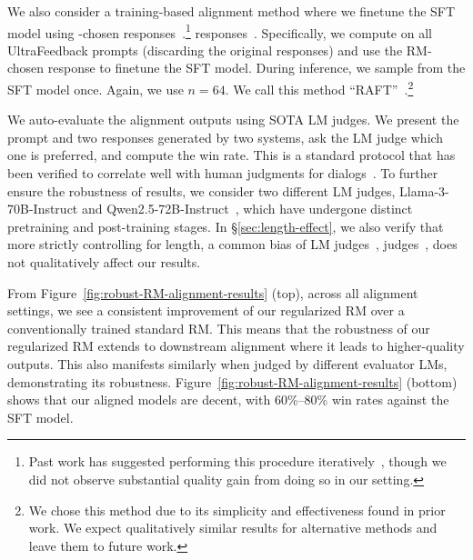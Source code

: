 We also consider a training-based alignment method where we finetune the SFT model using \bon-chosen
\iflongversion
responses~\citep{singh2024beyond,dong2023raft,yasunaga2024almaalignmentminimalannotation}.\footnote{Past work has suggested performing this procedure iteratively~\citep{dong2023raft}, though we did not observe substantial quality gain from doing so in our setting.}
\else
responses~\citep{singh2024beyond,dong2023raft,yasunaga2024almaalignmentminimalannotation}.
\fi
Specifically, we compute \bon on all UltraFeedback prompts
(discarding the original responses)
and use the RM-chosen response to finetune the SFT model. During inference, we sample from the SFT model once. Again, we use $n=64$.
We call this method ``RAFT''~\citep{dong2023raft}.\footnote{We chose this method due to its simplicity and effectiveness found in prior work. We expect qualitatively similar results for alternative methods and leave them to future work.
}

We auto-evaluate the alignment outputs using
SOTA LM judges.
We present the prompt and two responses generated by two systems, ask the LM judge which one is preferred, and compute the win rate.
This is a standard protocol that has been verified to correlate well with human judgments for dialogs~.
To further ensure the robustness of results, we consider two different LM judges, Llama-3-70B-Instruct and Qwen2.5-72B-Instruct~\citep{qwen2.5}, which have undergone distinct pretraining and post-training stages.
In \S\ref{sec:length-effect}, we also verify that more strictly controlling for length, a common bias of LM
\iflongversion
judges~\citep{wang2023how,singhal2023long},
\else
judges~\citep{singhal2023long},
\fi
does not qualitatively affect our results.

From Figure~\ref{fig:robust-RM-alignment-results} (top), across all alignment settings, we see a consistent improvement of our regularized RM over a conventionally trained standard RM.
This means that the robustness of our regularized RM extends to downstream alignment where it leads to higher-quality outputs.
This also manifests similarly when judged by different evaluator LMs, demonstrating its robustness.
Figure~\ref{fig:robust-RM-alignment-results} (bottom) shows that our aligned models are decent, with 60\%--80\% win rates against the SFT model.
